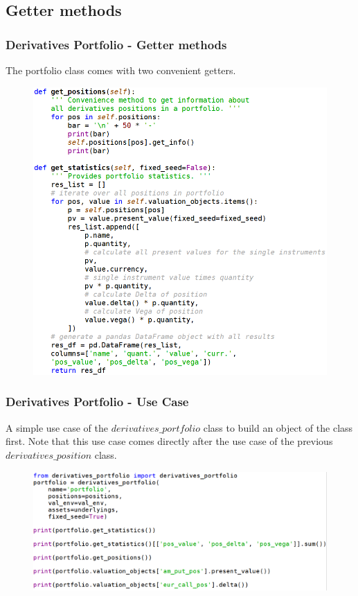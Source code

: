 \documentclass{beamer}
\begin{document}
\subsection{Getter methods}
\begin{frame}
\frametitle{Derivatives Portfolio - Getter methods}
The portfolio class comes with two convenient getters.
\begin{figure}[H]
	\includegraphics[scale=0.32]{derivatives_portfolio_getter_methods.png}
\end{figure}
\end{frame}

\begin{frame}
\frametitle{Derivatives Portfolio - Use Case}
A simple use case of the $derivatives\_portfolio$ class to build an object of the class first. Note that this use case comes directly after the use case of the previous $derivatives\_position$ class.
\begin{figure}[H]
	\includegraphics[scale=0.46]{derivatives_portfolio_use_case_1.png}
\end{figure}
\end{frame}
\end{document}
